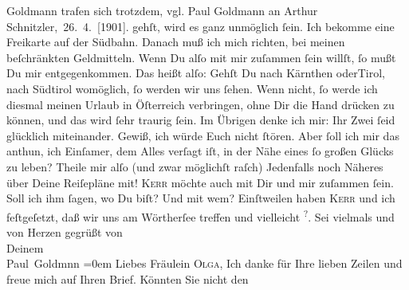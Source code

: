 \begin{ledgroupsized}[t]{13cm}
{{{                     Goldmann trafen sich trotzdem, vgl. Paul Goldmann an Arthur Schnitzler, 26. 4. [1901].}}}\label{K_L03071-1h} gehſt, wird es
               ganz unmöglich ſein. Ich bekomme eine Freikarte auf der Südbahn. Danach muß ich mich richten, bei meinen beſchränkten
               Geldmitteln. Wenn Du alſo mit mir {\pb}zuſammen ſein
               willſt, ſo mußt Du mir entgegenkommen. Das heißt alſo: Gehſt Du nach \introOben{}Kärnthen oder\introOben{}{ }Tirol, nach Südtirol womöglich, ſo werden wir uns ſehen. Wenn  nicht, ſo werde ich diesmal meinen Urlaub in Öſterreich verbringen, ohne Dir die Hand drücken zu können, und das wird
               ſehr traurig ſein. Im Übrigen denke ich mir: Ihr Zwei ſeid glücklich miteinander.
               Gewiß, ich würde Euch nicht ſtören. Aber ſoll ich mir das anthun, ich Einſamer, {\pb}dem Alles verſagt iſt, in der Nähe eines ſo großen
               Glücks zu leben?\pend
           \pstart
           Theile mir alſo \introOben{}(und zwar möglichſt raſch)\introOben{}{ } Jedenfalls noch Näheres über Deine Reiſepläne mit! \textsc{Kerr} möchte auch mit Dir und mir zuſammen ſein. Soll ich ihm ſagen, wo Du biſt? Und
               mit wem? Einſtweilen haben \textsc{Kerr} und ich feſtgeſetzt, daß wir uns am Wörtherſee treffen und vielleicht \label{K_L03071-2v}\label{K_L03071-2h}\substVorne{}\textsuperscript{?}\substDazwischen{}.\substHinten{}\pend
           \pstart
           {\pb}Sei vielmals und von Herzen gegrüßt von {\\[\baselineskip]}Deinem {\\[\baselineskip]}\spacefill\mbox{Paul Goldmnn}\pend
           \leftskip=0em{}{\bigskip}\pstart
           \noindent{}Liebes Fräulein \textsc{Olga}, Ich
               danke für Ihre lieben Zeilen und freue mich auf Ihren Brief. Könnten Sie nicht den

\end{ledgroupsized}
